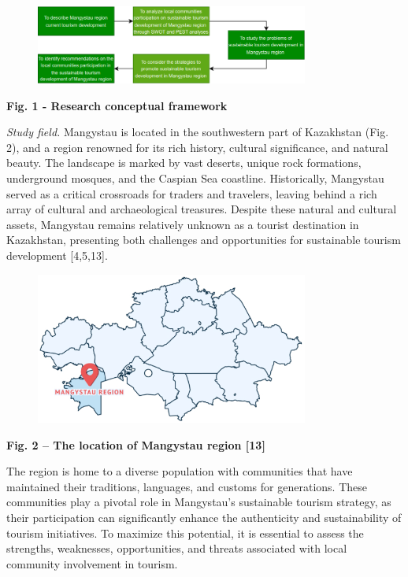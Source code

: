 \begin{figure}[H]
	\centering
	\includegraphics[width=0.8\textwidth]{assets/337}
	\caption*{}
\end{figure}

{\bfseries Fig. 1 - Research conceptual framework}

\emph{Study field.} Mangystau is located in the southwestern part of
Kazakhstan (Fig. 2), and a region renowned for its rich history,
cultural significance, and natural beauty. The landscape is marked by
vast deserts, unique rock formations, underground mosques, and the
Caspian Sea coastline. Historically, Mangystau served as a critical
crossroads for traders and travelers, leaving behind a rich array of
cultural and archaeological treasures. Despite these natural and
cultural assets, Mangystau remains relatively unknown as a tourist
destination in Kazakhstan, presenting both challenges and opportunities
for sustainable tourism development {[}4,5,13{]}.

\begin{figure}[H]
	\centering
	\includegraphics[width=0.8\textwidth]{assets/338}
	\caption*{}
\end{figure}

{\bfseries Fig. 2 -- The location of Mangystau region {[}13{]}}

The region is home to a diverse population with communities that have
maintained their traditions, languages, and customs for generations.
These communities play a pivotal role in Mangystau's sustainable tourism
strategy, as their participation can significantly enhance the
authenticity and sustainability of tourism initiatives. To maximize this
potential, it is essential to assess the strengths, weaknesses,
opportunities, and threats associated with local community involvement
in tourism.

